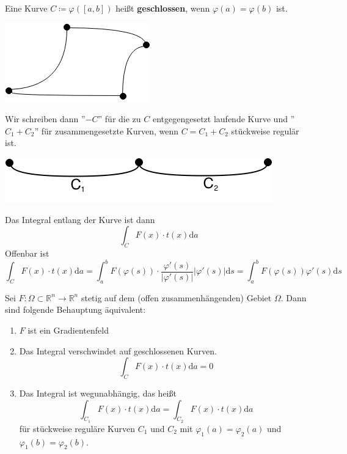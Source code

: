 \begin{definition}
Eine Kurve $C\coloneqq\varphi([a,b])$ heißt \textbf{geschlossen}, 
wenn $\varphi(a)=\varphi(b)$ ist.
\begin{center}
	\includegraphics[scale=0.5]{pictures/010-02.png}
\end{center}
Wir schreiben dann ''$-C$'' für die zu $C$ entgegengesetzt laufende 
Kurve und ''$C_1+C_2$'' für zusammengesetzte Kurven, wenn $C=C_1+C_2$ stückweise regulär ist.
\begin{center}
	\includegraphics[scale=0.5]{pictures/010-02_1.png}
\end{center}
Das Integral entlang der Kurve ist dann
\begin{equation*}
	\int_CF(x)\cdot t(x)\mathrm{d}a
\end{equation*}
Offenbar ist 
\begin{equation}
	\int_CF(x)\cdot t(x)\mathrm{d}a = 
	\int_a^b F(\varphi(s))\cdot\frac{\varphi'(s)}{|\varphi'(s)|}
	|\varphi'(s)|\mathrm{d}s = 
	\int_a^b F(\varphi(s))\varphi'(s)\mathrm{d}s
\end{equation}
\end{definition}
\newpage
\begin{satz}
Sei $F:\Omega\subset\mathbb{R}^n\rightarrow\mathbb{R}^n$ stetig 
auf dem (offen zusammenhängenden) Gebiet $\Omega$. Dann sind 
folgende Behauptung äquivalent:
\begin{enumerate}
	\item 	$F$ ist ein Gradientenfeld
	\item 	Das Integral verschwindet auf geschlossenen 
			Kurven.
			\begin{equation}
					\int_C F(x)\cdot t(x)\mathrm{d}a = 0
			\end{equation}
	\item 	Das Integral ist wegunabhängig, das heißt
			\begin{equation}
					\int_{C_1} F(x)\cdot t(x)\mathrm{d}a = 
					\int_{C_2} F(x)\cdot t(x)\mathrm{d}a
			\end{equation}
			für stückweise reguläre Kurven $C_1$ und $C_2$ 
			mit $\varphi_1(a)=\varphi_2(a)$ und 
			$\varphi_1(b)=\varphi_2(b)$.
\end{enumerate}
\end{satz}

